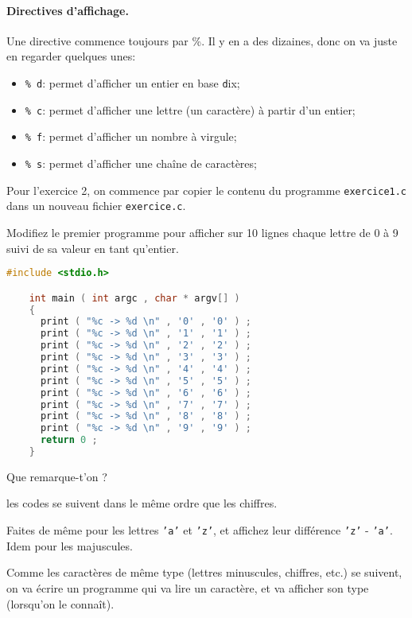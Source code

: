 \paragraph{Directives d'affichage.} Une directive commence toujours
par \%. Il y en a des dizaines, donc on va juste en regarder quelques unes:
\begin{itemize}
\item \texttt{\% d}: permet d'afficher un entier en base \texttt{d}ix;
\item \texttt{\% c}: permet d'afficher une lettre (un caractère) à partir d'un entier;
\item \texttt{\% f}: permet d'afficher un nombre à virgule;
\item \texttt{\% s}: permet d'afficher une chaîne de caractères;
\end{itemize}
Pour l'exercice 2, on commence par copier le contenu du programme
\texttt{exercice1.c} dans un nouveau fichier \texttt{exercice.c}.


\question Modifiez le premier programme pour afficher sur 10 lignes
chaque lettre de 0 à 9 suivi de sa valeur en tant qu'entier.
\begin{solution}
  \begin{lstlisting}[language=C]
    #include <stdio.h>

    int main ( int argc , char * argv[] ) 
    {
      print ( "%c -> %d \n" , '0' , '0' ) ;
      print ( "%c -> %d \n" , '1' , '1' ) ;
      print ( "%c -> %d \n" , '2' , '2' ) ;
      print ( "%c -> %d \n" , '3' , '3' ) ;
      print ( "%c -> %d \n" , '4' , '4' ) ;
      print ( "%c -> %d \n" , '5' , '5' ) ;
      print ( "%c -> %d \n" , '6' , '6' ) ;
      print ( "%c -> %d \n" , '7' , '7' ) ;
      print ( "%c -> %d \n" , '8' , '8' ) ;
      print ( "%c -> %d \n" , '9' , '9' ) ;
      return 0 ; 
    }
  \end{lstlisting}
\end{solution}
Que remarque-t'on ?

\begin{solution}
  les codes se suivent dans le même ordre que les chiffres.
\end{solution}

\question Faites de même pour les lettres \texttt{'a'} et \texttt{'z'}, et affichez leur
différence \texttt{'z'} - \texttt{'a'}. Idem pour les majuscules.

\prerequis{}
Comme les caractères de même type (lettres minuscules, chiffres, etc.)
se suivent, on va écrire un programme qui va lire un caractère, et va
afficher son type (lorsqu'on le connaît).

